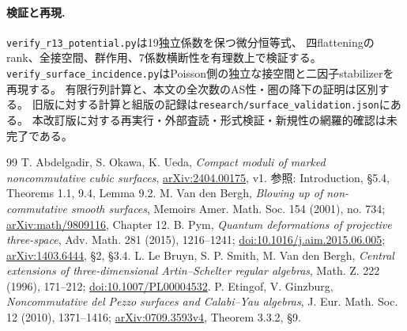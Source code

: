 \documentclass[11pt,a4paper]{ltjsarticle}
\theoremstyle{definition}\newtheorem{remark}[theorem]{注意}
\begin{document}
\paragraph{検証と再現.}
\texttt{verify\_r13\_potential.py}は19独立係数を保つ微分恒等式、
四flatteningのrank、全接空間、群作用、7係数横断性を有理数上で検証する。
\texttt{verify\_surface\_incidence.py}はPoisson側の独立な接空間と二因子stabilizerを再現する。
有限行列計算と、本文の全次数のAS性・圏の降下の証明は区別する。
旧版に対する計算と組版の記録は\texttt{research/surface\_validation.json}にある。
本改訂版に対する再実行・外部査読・形式検証・新規性の網羅的確認は未完了である。

\begin{thebibliography}{99}
 T. Abdelgadir, S. Okawa, K. Ueda,
\emph{Compact moduli of marked noncommutative cubic surfaces},
\href{https://arxiv.org/abs/2404.00175}{arXiv:2404.00175}, v1.
参照: Introduction, \S5.4, Theorems 1.1, 9.4, Lemma 9.2.
 M. Van den Bergh,
\emph{Blowing up of non-commutative smooth surfaces},
Memoirs Amer. Math. Soc. 154 (2001), no. 734;
\href{https://arxiv.org/abs/math/9809116}{arXiv:math/9809116}, Chapter 12.
 B. Pym, \emph{Quantum deformations of projective three-space},
Adv. Math. 281 (2015), 1216--1241; \href{https://doi.org/10.1016/j.aim.2015.06.005}{doi:10.1016/j.aim.2015.06.005};
\href{https://arxiv.org/abs/1403.6444}{arXiv:1403.6444}, \S2, \S3.4.
 L. Le Bruyn, S. P. Smith, M. Van den Bergh,
\emph{Central extensions of three-dimensional Artin--Schelter regular algebras},
Math. Z. 222 (1996), 171--212; \href{https://doi.org/10.1007/PL00004532}{doi:10.1007/PL00004532}.
 P. Etingof, V. Ginzburg,
\emph{Noncommutative del Pezzo surfaces and Calabi--Yau algebras},
J. Eur. Math. Soc. 12 (2010), 1371--1416;
\href{https://arxiv.org/abs/0709.3593}{arXiv:0709.3593v4}, Theorem 3.3.2, \S9.


\end{thebibliography}
\end{document}
